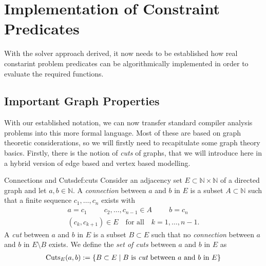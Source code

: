 \section{Implementation of Constraint Predicates}

    With the solver approach derived, it now needs to be established how real
    constarint problem predicates can be algorithmically implemented in order
    to evaluate the required functions.

\subsection{Important Graph Properties}

    With our established notation, we can now transfer standard compiler
    analysis problems into this more formal language.
    Most of these are based on graph theoretic considerations, so we
    will firstly need to recapitulate some graph theory basics.
    Firstly, there is the notion of {\em cuts} of graphs, that we will introduce
    here in a hybrid version of edge based and vertex based modelling.

    \begin{definition}{Connections and Cuts}{def:cuts}
        Consider an adjacency set $E\subset\mathbb{N}\times\mathbb{N}$ of a
        directed graph and let $a,b\in\mathbb{N}$.
        \newline
        A {\em connection} between $a$ and $b$ in $E$ is a subset
        $A\subset\mathbb{N}$ such that a finite sequence $c_1,\dots,c_n$
        exists with
        \begin{gather*}
            a=c_1\hspace{1cm}c_2,\dots,c_{n-1}\in A\hspace{1cm}b=c_n\\
            (c_k,c_{k+1})\in E\hspace{1em}\text{for all}\hspace{1em}k=1,\dots,n-1.
        \end{gather*}
        A {\em cut} between $a$ and $b$ in $E$ is a subset $B\subset E$
        such that no {\em connection} between $a$ and $b$ in $E\setminus B$
        exists.
        We define the {\em set of cuts} between $a$ and $b$ in $E$ as
        \begin{align*}
            \text{Cuts}_E(a,b):=\{B\subset E\mid B\text{ is {\em cut} between $a$ and $b$ in $E$}\}
        \end{align*}
    \end{definition}

